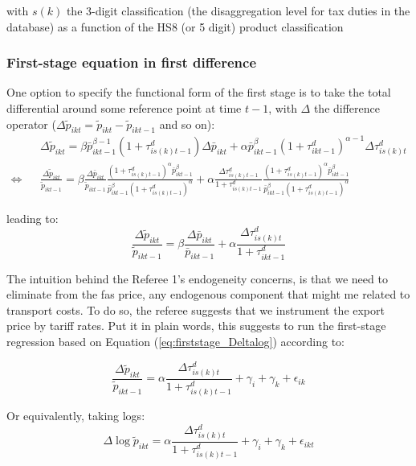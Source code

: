 \documentclass[11pt,twoside, authoryear]{elsarticle}
\begin{document}
\noindent with $s(k)$ the 3-digit classification (the disaggregation level for tax duties in the database) as a function of the HS8 (or 5 digit) product classification

\subsubsection{First-stage equation in first difference \label{ssec:first_diff}}

One option to specify the functional form of the first stage is to take the total differential around some reference point at time $t-1$, with $\Delta $ the difference operator ($\Delta\widetilde{p}_{ikt} = \widetilde{p}_{ikt} - \widetilde{p}_{ikt-1}$ and so on):
\begin{eqnarray*}
&&\Delta \widetilde{p}_{ikt} = \beta \bar{p}_{ikt-1}^{\beta-1}(1+\tau^d_{is(k)t-1})\Delta \bar{p}_{ikt} + \alpha \bar{p}^\beta_{ikt-1} (1+\tau^d_{ikt-1})^{\alpha-1}\Delta \tau^d_{is(k)t}  \\
\Leftrightarrow &&\frac{\Delta \widetilde{p}_{ikt}}{\widetilde{p}_{ikt-1}} = \beta \frac{\Delta \bar{p}_{ikt}}{\widetilde{p}_{ikt-1}} \frac{(1+\tau^d_{is(k)t-1})^\alpha \bar{p}_{ikt-1}^\beta}{\bar{p}^\beta_{ikt-1}(1+\tau^d_{is(k)t-1})^\alpha} +\alpha \frac{\Delta \tau^d_{is(k)t-1}}{1+\tau_{is(k)t-1}^d}\frac{(1+\tau^d_{is(k)t-1})^\alpha \bar{p}_{ikt-1}^\beta}{\bar{p}^\beta_{ikt-1}(1+\tau^d_{is(k)t-1})^\alpha} \end{eqnarray*}

leading to:
\begin{equation}
\frac{\Delta \widetilde{p}_{ikt}}{\widetilde{p}_{ikt-1}} =  \beta \frac{\Delta \bar{p}_{ikt}}{\bar{p}_{ikt-1}} +\alpha\frac{\Delta \tau^d_{is(k)t}}{1+\tau_{ikt-1}^d} \label{eq:firststage_Deltalog}
\end{equation}

The intuition behind the Referee 1's endogeneity concerns, is that we need to eliminate from the fas price, any endogenous component that might me related to transport costs. To do so, the referee suggests that we instrument the export price by tariff rates. Put it in plain words, this suggests to run the first-stage regression based on Equation (\ref{eq:firststage_Deltalog}) according to:

$$\frac{\Delta \widetilde{p}_{ikt}}{\widetilde{p}_{ikt-1}} = \alpha \frac{\Delta \tau^d_{is(k)t}}{1+\tau_{is(k)t-1}^d} + \gamma_{i} +\gamma_{k}+\epsilon_{ik}$$

Or equivalently, taking logs:
$$\Delta \log \widetilde{p}_{ikt}= \alpha\frac{\Delta \tau^d_{is(k)t}}{1+\tau_{is(k)t-1}^d} +\gamma_{i} +\gamma_{k}+\epsilon_{ikt}$$
\end{document}
